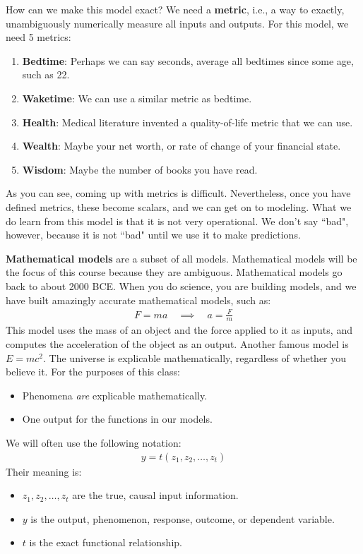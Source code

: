 \documentclass[12pt, a4paper]{article}
\theoremstyle{definition}
\begin{document}
	How can we make this model exact? We need a \textbf{metric}, i.e., a way to exactly,
	unambiguously numerically measure all inputs and outputs. For this model, we need 5 metrics:
	\begin{enumerate}[label=(\arabic*)]
		\item \textbf{Bedtime}: Perhaps we can say seconds, average all bedtimes
		since some age, such as 22.
		\item \textbf{Waketime}: We can use a similar metric as bedtime.
		\item \textbf{Health}: Medical literature invented a quality-of-life metric that we can use.
		\item \textbf{Wealth}: Maybe your net worth, or rate of change of your financial state.
		\item \textbf{Wisdom}: Maybe the number of books you have read.
	\end{enumerate}
	As you can see, coming up with metrics is difficult. Nevertheless, once you have defined metrics,
	these become scalars, and we can get on to modeling. What we do learn from this model
	is that it is not very operational. We don't say ``bad", however, because it is not
	``bad" until we use it to make predictions.
	
	\textbf{Mathematical models} are a subset of all models. Mathematical models will be the
	focus of this course because they are ambiguous. Mathematical models go back to
	about 2000 BCE. When you do science, you are building models, and we have built amazingly
	accurate mathematical models, such as:
	\begin{align*}
		F=ma\quad\implies\quad a=\frac{F}{m}
	\end{align*}
	This model uses the mass of an object and the force applied to it as inputs, and computes
	the acceleration of the object as an output. Another famous model is $E=mc^2$.
	The universe is explicable mathematically, regardless of whether you believe it.
	For the purposes of this class:
	\begin{itemize}
		\item Phenomena \textit{are} explicable mathematically.
		\item One output for the functions in our models.
	\end{itemize}
	We will often use the following notation:
	\begin{align*}
		y = t(z_1,z_2,\ldots,z_t)
	\end{align*}
	Their meaning is:
	\begin{itemize}
		\item $z_1,z_2,\ldots,z_t$ are the true, causal input information.
		\item $y$ is the output, phenomenon, response, outcome, or dependent variable.
		\item $t$ is the exact functional relationship.
	\end{itemize}
\end{document}

